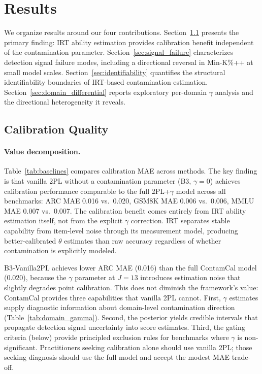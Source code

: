 \section{Results}
\label{sec:results}

We organize results around our four contributions. Section~\ref{sec:calibration_results} presents the primary finding: IRT ability estimation provides calibration benefit independent of the contamination parameter. Section~\ref{sec:signal_failure} characterizes detection signal failure modes, including a directional reversal in Min-K\%++ at small model scales. Section~\ref{sec:identifiability} quantifies the structural identifiability boundaries of IRT-based contamination estimation. Section~\ref{sec:domain_differential} reports exploratory per-domain $\gamma$ analysis and the directional heterogeneity it reveals.

\subsection{Calibration Quality}
\label{sec:calibration_results}

\paragraph{Value decomposition.}
Table~\ref{tab:baselines} compares calibration MAE across methods. The key finding is that vanilla 2PL without a contamination parameter (B3, $\gamma = 0$) achieves calibration performance comparable to the full 2PL+$\gamma$ model across all benchmarks: ARC MAE 0.016 vs.\ 0.020, GSM8K MAE 0.006 vs.\ 0.006, MMLU MAE 0.007 vs.\ 0.007. The calibration benefit comes entirely from IRT ability estimation itself, not from the explicit $\gamma$ correction. IRT separates stable capability from item-level noise through its measurement model, producing better-calibrated $\theta$ estimates than raw accuracy regardless of whether contamination is explicitly modeled.

B3-Vanilla2PL achieves lower ARC MAE (0.016) than the full ContamCal model (0.020), because the $\gamma$ parameter at $J = 13$ introduces estimation noise that slightly degrades point calibration. This does not diminish the framework's value: ContamCal provides three capabilities that vanilla 2PL cannot. First, $\gamma$ estimates supply diagnostic information about domain-level contamination direction (Table~\ref{tab:domain_gamma}). Second, the posterior yields credible intervals that propagate detection signal uncertainty into score estimates. Third, the gating criteria (below) provide principled exclusion rules for benchmarks where $\gamma$ is non-significant. Practitioners seeking calibration alone should use vanilla 2PL; those seeking diagnosis should use the full model and accept the modest MAE trade-off.

